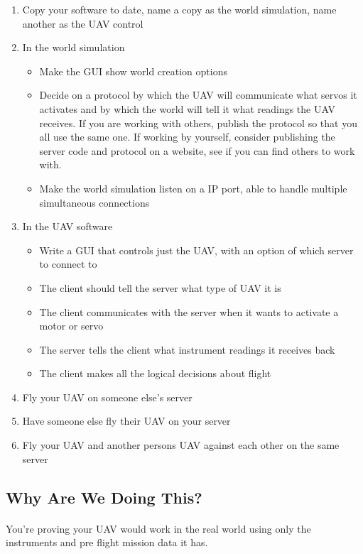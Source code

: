 \documentclass[11pt]{book}
\begin{document}
\begin{enumerate}
\item Copy your software to date, name a copy as the world simulation, name another as the UAV control
\item In the world simulation 
    \begin{itemize}
        \item Make the GUI show world creation options
        \item Decide on a protocol by which the UAV will communicate what servos it activates and by which the world will tell it what readings the UAV receives. If you are working with others, publish the protocol so that you all use the same one. If working by yourself, consider publishing the server code and protocol on a website, see if you can find others to work with.
        \item Make the world simulation listen on a IP port, able to handle multiple simultaneous connections
    \end{itemize}
\item In the UAV software
    \begin{itemize}
        \item Write a GUI that controls just the UAV, with an option of which server to connect to
        \item The client should tell the server what type of UAV it is
        \item The client communicates with the server when it wants to activate a motor or servo
        \item The server tells the client what instrument readings it receives back
        \item The client makes all the logical decisions about flight
    \end{itemize}
\item Fly your UAV on someone else's server
\item Have someone else fly their UAV on your server
\item Fly your UAV and another persons UAV against each other on the same server
\end{enumerate}

\subsection{Why Are We Doing This?}

\paragraph{} You're proving your UAV would work in the real world using only the instruments and pre flight mission data it has.
 
\end{document}
